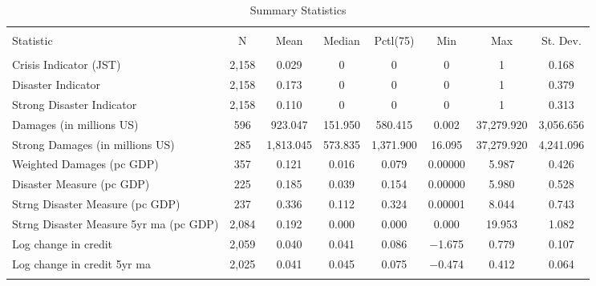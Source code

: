 
\begin{table}[!htbp] \centering 
  \caption{Summary Statistics} 
  \label{sumtab} 
\footnotesize 
\begin{tabular}{@{\extracolsep{5pt}}lccccccc} 
\\[-1.8ex]\hline 
\hline \\[-1.8ex] 
Statistic & \multicolumn{1}{c}{N} & \multicolumn{1}{c}{Mean} & \multicolumn{1}{c}{Median} & \multicolumn{1}{c}{Pctl(75)} & \multicolumn{1}{c}{Min} & \multicolumn{1}{c}{Max} & \multicolumn{1}{c}{St. Dev.} \\ 
\hline \\[-1.8ex] 
Crisis Indicator (JST) & 2,158 & 0.029 & 0 & 0 & 0 & 1 & 0.168 \\ 
Disaster Indicator & 2,158 & 0.173 & 0 & 0 & 0 & 1 & 0.379 \\ 
Strong Disaster Indicator & 2,158 & 0.110 & 0 & 0 & 0 & 1 & 0.313 \\ 
Damages (in millions US) & 596 & 923.047 & 151.950 & 580.415 & 0.002 & 37,279.920 & 3,056.656 \\ 
Strong Damages (in millions US) & 285 & 1,813.045 & 573.835 & 1,371.900 & 16.095 & 37,279.920 & 4,241.096 \\ 
Weighted Damages (pc GDP) & 357 & 0.121 & 0.016 & 0.079 & 0.00000 & 5.987 & 0.426 \\ 
Disaster Measure (pc GDP) & 225 & 0.185 & 0.039 & 0.154 & 0.00000 & 5.980 & 0.528 \\ 
Strng Disaster Measure (pc GDP) & 237 & 0.336 & 0.112 & 0.324 & 0.00001 & 8.044 & 0.743 \\ 
Strng Disaster Measure 5yr ma (pc GDP)  & 2,084 & 0.192 & 0.000 & 0.000 & 0.000 & 19.953 & 1.082 \\ 
Log change in credit & 2,059 & 0.040 & 0.041 & 0.086 & $-$1.675 & 0.779 & 0.107 \\ 
Log change in credit 5yr ma & 2,025 & 0.041 & 0.045 & 0.075 & $-$0.474 & 0.412 & 0.064 \\ 
\hline \\[-1.8ex] 
\end{tabular} 
\end{table} 
